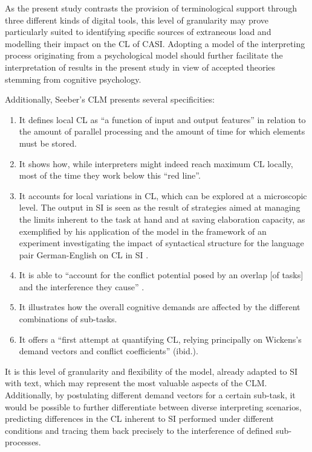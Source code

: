 As the present study contrasts the provision of terminological support through three different kinds of digital tools, this level of granularity may prove particularly suited to identifying specific sources of extraneous load and modelling their impact on the CL of CASI. Adopting a model of the interpreting process originating from a psychological model should further facilitate the interpretation of results in the present study in view of accepted theories stemming from cognitive psychology.

Additionally, Seeber's CLM presents several specificities:

\begin{enumerate}
\item It defines local CL as ``a function of input and output features'' \citep[189]{seeber_cognitive_2011} in relation to the amount of parallel processing and the amount of time for which elements must be stored.
\item It shows how, while interpreters might indeed reach maximum CL locally, most of the time they work below this ``red line''.
\item It accounts for local variations in CL, which can be explored at a microscopic level. The output in SI is seen as the result of strategies aimed at managing the limits inherent to the task at hand and at saving elaboration capacity, as exemplified by his application of the model in the framework of an experiment investigating the impact of syntactical structure for the language pair German-English on CL in SI \citep{seeber_cognitive_2011}.
\item It is able to ``account for the conflict potential posed by an overlap [of tasks] and the interference they cause'' \citep[189]{seeber_cognitive_2011}.
\item It illustrates how the overall cognitive demands are affected by the different combinations of sub-tasks.
\item It offers a ``first attempt at quantifying CL, relying principally on Wickens's demand vectors and conflict coefficients'' (ibid.).
\end{enumerate}

It is this level of granularity and flexibility of the model, already adapted to SI with text, which may represent the most valuable aspects of the CLM. Additionally, by postulating different demand vectors for a certain sub-task, it would be possible to further differentiate between diverse interpreting scenarios, predicting differences in the CL inherent to SI performed under different conditions and tracing them back precisely to the interference of defined sub-processes.

